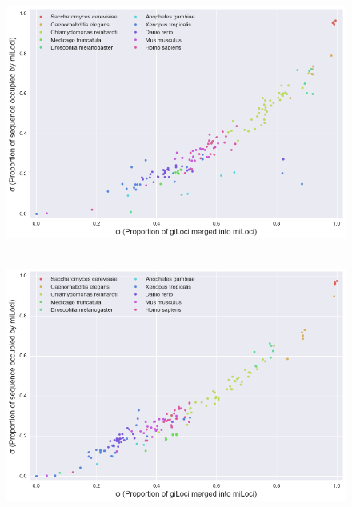 \begin{figure}[h]
\includegraphics[width=6in]{Assets/Graphics/iLoci/modorg-compactness.png}
\centering
\caption{~}
\label{Fig:ModOrgCompactness}
\end{figure}

\begin{figure}[h]
\includegraphics[width=6in]{Assets/Graphics/iLoci/compactness-shuffled.png}
\centering
\caption{~}
\label{Fig:CompactnessShuffled}
\end{figure}

\clearpage


